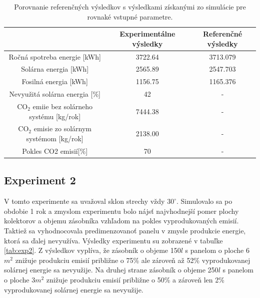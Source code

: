 \documentclass[a4paper, 11pt]{article}
\begin{document}
\begin{table}[H]
	\centering
	\begin{tabular}{|c|c|c|}
		\hline
		& Experimentálne výsledky & Referenčné výsledky \\ \hline
		Ročná spotreba energie {[}kWh{]} & 3722.64 & 3713.079 \\ \hline
		Solárna energia {[}kWh{]} & 2565.89 & 2547.703 \\ \hline
		Fosilná energia {[}kWh{]} & 1156.75 & 1165.376 \\ \hline
		Nevyužitá solárna energia {[}\%{]} & 42 & - \\ \hline
		CO$_2$ emiie bez solárneho systému {[}kg/rok{]} & 7444.38 & - \\ \hline
		CO$_2$ emisie zo solárnym systémom {[}kg/rok{]} & 2138.00 & - \\ \hline
		Pokles CO2 emisií{[}\%{]} & 70 & - \\ \hline
	\end{tabular}
	\caption{Porovnanie referenčných výsledkov s výsledkami získanými zo simulácie pre rovnaké vstupné parametre.}
	\label{tab:exp1_output}
\end{table}

\subsection{Experiment 2}
V tomto experimente sa uvažoval sklon strechy vždy $30^{\circ}$. Simulovalo sa po obdobie 1 rok a zmyslom experimentu bolo nájsť najvhodnejší pomer plochy kolektorov a objemu zásobníka vzhľadom na pokles vyprodukovaných emisií. Taktiež sa vyhodnocovala predimenzovanoť panelu v zmysle produkcie energie, ktorá sa ďalej nevyužíva. Výsledky experimentu su zobrazené v tabuľke \ref{tab:exp2}. Z výsledkov vyplíva, že zásobník o objeme 150$l$ s panelom o ploche 6$m^2$ znižuje produkciu emisií približne o 75\% ale zároveň až 52\% vyprodukovanej solárnej energie sa nevyužije. Na druhej strane zásobník o objeme 250$l$ s panelom o ploche 3$m^2$ znižuje produkciu emisií približne o 50\% a zároveň len 2\% vyprodukovanej solárnej energie sa nevyužije.
\end{document}
